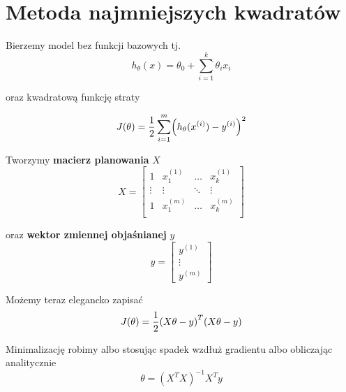 \section{Metoda najmniejszych kwadratów}

Bierzemy model bez funkcji bazowych tj.
\[
    h_\theta(x) = \theta_0 + \sum_{i=1}^k \theta_i x_i
\]

oraz kwadratową funkcję straty

\[
    J(\theta) = \frac{1}{2} \sum_{i=1}^m \pars{h_\theta(x^{(i)}) - y^{(i)}}^2
\]

Tworzymy \textbf{macierz planowania} \( X \)
\[
    X = \begin{bmatrix}
        1 & x^{(1)}_1 & \hdots & x^{(1)}_k \\
        \vdots & \vdots & \ddots & \vdots \\
        1 & x^{(m)}_1 & \hdots & x^{(m)}_k \\
    \end{bmatrix}
\]

oraz \textbf{wektor zmiennej objaśnianej} \( y \)
\[
    y = \begin{bmatrix}
        y^{(1)} \\
        \vdots \\
        y^{(m)}
    \end{bmatrix}
\]

Możemy teraz elegancko zapisać
\[
    J(\theta) = \frac{1}{2}\pars{X\theta - y}^T\pars{X\theta - y}
\]

Minimalizację robimy albo stosując spadek wzdłuż gradientu albo obliczając analitycznie
\[
    \theta = (X^TX)^{-1}X^Ty
\]